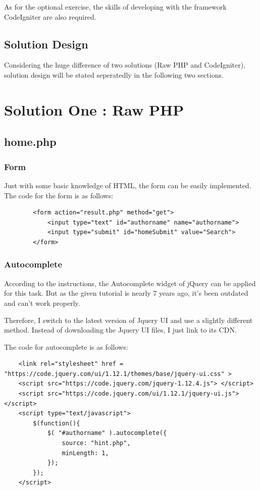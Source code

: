 \documentclass[a4paper]{article}
\begin{document}
As for the optional exercise, the skills of developing with the framework CodeIgniter are also required.
        \subsection{Solution Design}
Considering the huge difference of two solutions (Raw PHP and CodeIgniter), solution design will be stated seperatedly in the following two sections.

    \section{Solution One : Raw PHP}
        \subsection{home.php}
            \subsubsection{Form}
Just with some basic knowledge of HTML, the form can be easily implemented. The code for the form is as follows:
                \begin{verbatim}
        <form action="result.php" method="get">
            <input type="text" id="authorname" name="authorname">
            <input type="submit" id="homeSubmit" value="Search">
        </form>
                \end{verbatim}
            \subsubsection{Autocomplete}
According to the instructions, the Autocomplete widget of jQuery can be applied for this task. But as the given tutorial is nearly 7 years ago, it's been outdated and can't work properly.

Therefore, I switch to the latest version of Jquery UI and use a slightly different method. Instead of downloading the Jquery UI files, I just link to its CDN.

The code for autocomplete is as follows:
                \begin{verbatim}
    <link rel="stylesheet" href = "https://code.jquery.com/ui/1.12.1/themes/base/jquery-ui.css" >
    <script src="https://code.jquery.com/jquery-1.12.4.js"> </script>
    <script src="https://code.jquery.com/ui/1.12.1/jquery-ui.js"> </script>
    <script type="text/javascript">
        $(function(){
            $( "#authorname" ).autocomplete({
                source: "hint.php",
                minLength: 1,
            });
        });
    </script>
                \end{verbatim}
\end{document}
